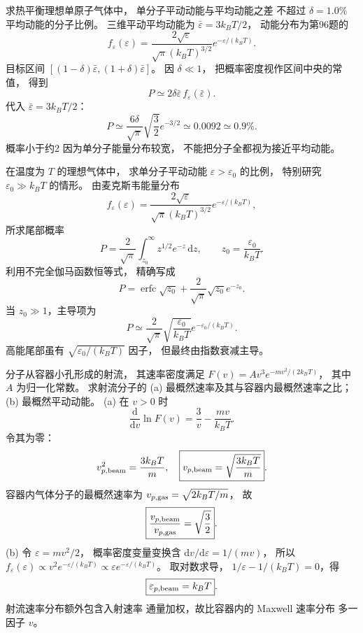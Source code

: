 求热平衡理想单原子气体中，
单分子平动动能与平均动能之差
不超过 $\delta=1.0\%$
平均动能的分子比例。
\exsolution
三维平动平均动能为
$\bar\varepsilon=3k_BT/2$，
动能分布为第96题的
\[
f_\varepsilon(\varepsilon)
=\frac{2\sqrt\varepsilon}{\sqrt\pi(k_BT)^{3/2}}
e^{-\varepsilon/(k_BT)}.
\]
目标区间
$[(1-\delta)\bar\varepsilon,
(1+\delta)\bar\varepsilon]$。
因 $\delta\ll1$，
把概率密度视作区间中央的常值，
得到
\[
P\simeq2\delta\bar\varepsilon\,
f_\varepsilon(\bar\varepsilon).
\]
代入
$\bar\varepsilon=3k_BT/2$：
\[
\boxed{P\simeq
\frac{6\delta}{\sqrt\pi}
\sqrt{\frac32}e^{-3/2}
\simeq0.0092\simeq0.9\%}.
\]
\excheck 概率小于约2%
因为单分子能量分布较宽，
不能把分子全都视为接近平均动能。

在温度为 $T$ 的理想气体中，
求单分子平动动能
$\varepsilon>\varepsilon_0$ 的比例，
特别研究 $\varepsilon_0\gg k_BT$ 的情形。
\exsolution
由麦克斯韦能量分布
\[
f_\varepsilon(\varepsilon)
=\frac{2\sqrt\varepsilon}{\sqrt\pi(k_BT)^{3/2}}
e^{-\varepsilon/(k_BT)},
\]
所求尾部概率
\[
P=\frac2{\sqrt\pi}\int_{z_0}^\infty
z^{1/2}e^{-z}\,\mathrm dz,\qquad
z_0=\frac{\varepsilon_0}{k_BT}.
\]
利用不完全伽马函数恒等式，
精确写成
\[
P=\operatorname{erfc}\sqrt{z_0}
+\frac2{\sqrt\pi}\sqrt{z_0}e^{-z_0}.
\]
当 $z_0\gg1$，主导项为
\[
\boxed{P\simeq\frac2{\sqrt\pi}
\sqrt{\frac{\varepsilon_0}{k_BT}}
e^{-\varepsilon_0/(k_BT)}}.
\]
\excheck 高能尾部虽有
$\sqrt{\varepsilon_0/(k_BT)}$ 因子，
但最终由指数衰减主导。

分子从容器小孔形成的射流，
其速率密度满足
$F(v)=A v^3e^{-mv^2/(2k_BT)}$，
其中 $A$ 为归一化常数。
求射流分子的
(a) 最概然速率及其与容器内最概然速率之比；
(b) 最概然平动动能。
\exsolution
(a) 在 $v>0$ 时
\[
\frac{\mathrm d}{\mathrm dv}\ln F(v)
=\frac3v-\frac{mv}{k_BT}.
\]
令其为零：
\[
v_{p,\rm beam}^2=\frac{3k_BT}{m},
\quad
\boxed{v_{p,\rm beam}=\sqrt{\frac{3k_BT}{m}}}.
\]
容器内气体分子的最概然速率为
$v_{p,\rm gas}=\sqrt{2k_BT/m}$，
故
\[
\boxed{\frac{v_{p,\rm beam}}{v_{p,\rm gas}}
=\sqrt{\frac32}}.
\]
(b) 令 $\varepsilon=mv^2/2$，
概率密度变量变换含
$\mathrm dv/\mathrm d\varepsilon=1/(mv)$，
所以
$f_\varepsilon(\varepsilon)\propto
v^2e^{-\varepsilon/(k_BT)}
\propto\varepsilon e^{-\varepsilon/(k_BT)}$。
取对数求导，
$1/\varepsilon-1/(k_BT)=0$，得
\[
\boxed{\varepsilon_{p,\rm beam}=k_BT}.
\]
\excheck 射流速率分布额外包含入射速率
通量加权，故比容器内的 Maxwell 速率分布
多一因子 $v$。

